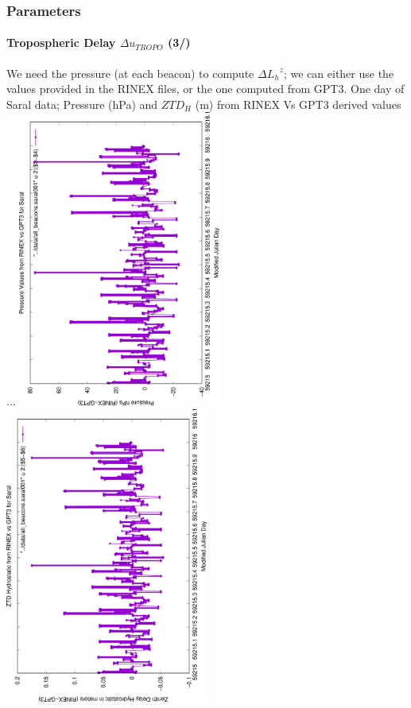 \documentclass{beamer}
\begin{document}
\begin{frame}\frametitle{Parameters}\framesubtitle{Tropospheric Delay \(\Delta u_{TROPO}\) (3/)}
  We need the pressure (at each beacon) to compute  \(\Delta {L_{h}}^{z}\); we can either 
  use the values provided in the RINEX files, or the one computed from GPT3.
  One day of Saral data; Pressure (hPa) and \(ZTD_H\) (m) from RINEX Vs GPT3 derived values ...
    \includegraphics[angle=-90, width=0.5\textwidth]{Saral-allbeacons-pressure}%
    \includegraphics[angle=-90, width=0.5\textwidth]{Saral-allbeacons-ztdh}
\end{frame}
\end{document}

